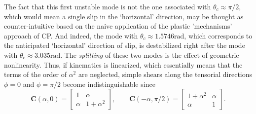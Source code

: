 \documentclass[CRPHYS,Unicode,manuscript]{cedram}
\begin{document}
The fact that this first unstable mode is not the one associated with $\theta_c\approx \pi/2$, which would mean a   single slip in the  `horizontal'  direction,  may be thought as counter-intuitive based on the naive application of the  plastic 'mechanisms'  approach of CP.  And   indeed,     the mode  with $\theta_c\approx1.5746\text{rad}$, which  corresponds   to the anticipated   `horizontal' direction of slip,   is  destabilized  right after  the mode  with $\theta_c\approx 3.035\text{rad}$. 
The  \emph{splitting}  of these two modes  is the  effect of geometric nonlinearity. Thus,  if kinematics is linearized, which essentially means that the terms of the order of $\alpha^2$ are neglected, simple shears along the tensorial directions $\phi=0$ and $\phi=\pi/2$  become indistinguishable 
since  
\begin{equation}
\label{eqn:Ezernov}
\mathbf{C}(\alpha,0)=\left[\begin{array}{cc}
1 & \alpha\\
\alpha & 1+\alpha^{2}
\end{array}\right],\qquad\mathbf{C}(-\alpha,\pi/2)=\left[\begin{array}{cc}
1+\alpha^{2} & \alpha\\
\alpha & 1
\end{array}\right].
 \end{equation}
\end{document}
